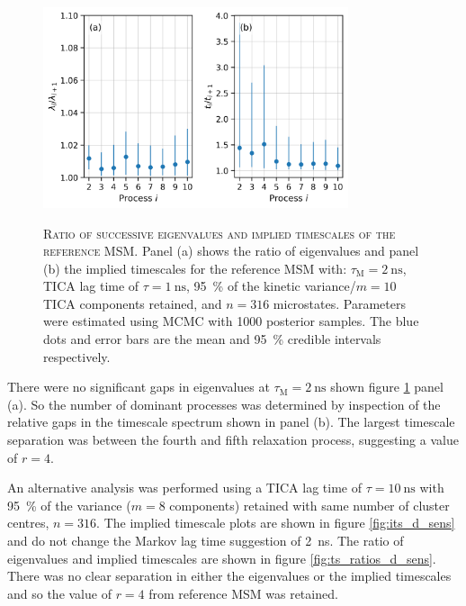 \begin{figure}
    \centering
    \caption[Ratio of successive eigenvalues and implied timescales of the reference MSM]{\textsc{Ratio of successive eigenvalues and implied timescales of the reference MSM}. Panel (a) shows the ratio of eigenvalues and panel (b) the implied timescales for the reference MSM with: $\tau_{\textrm{M}}=\SI{2}{\nano\second}$, TICA lag time of $\tau=\SI{1}{\nano\second}$, \SI{95}{\percent} of the kinetic variance/$m=10$ TICA components retained, and $n=316$ microstates. Parameters were estimated using MCMC with \num{1000} posterior samples. The blue dots and error bars are the mean and \SI{95}{\percent} credible intervals respectively.}
    \includegraphics[width=0.8\textwidth]{chapters/aadh/figures/timescale_ratios_D.png}
    \label{fig:ts_ratios_d}
\end{figure}

There were no significant gaps in eigenvalues at $\tau_{\mathrm{M}}=\SI{2}{\nano\second}$  shown figure \ref{fig:ts_ratios_d} panel (a). So the number of dominant processes was determined by inspection of the relative gaps in the timescale spectrum shown in  panel (b). The largest timescale separation was between the fourth and fifth relaxation process, suggesting a value of $r=4$. 

An alternative analysis was performed using a TICA lag time of $\tau=\SI{10}{\nano\second}$ with \SI{95}{\percent} of the variance ($m=8$ components) retained with same number of cluster centres, $n=316$. The implied timescale plots are shown in figure \ref{fig:its_d_sens} and  do not change the Markov lag time suggestion of \SI{2}{\nano\second}. The ratio of eigenvalues and implied timescales  are shown in figure \ref{fig:ts_ratios_d_sens}. There was no clear separation in either the eigenvalues or the implied timescales and so the value of $r=4$ from reference MSM was retained.

